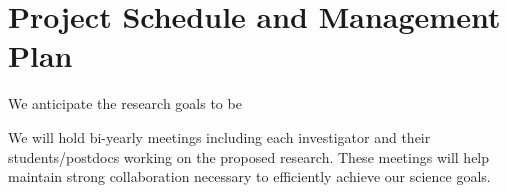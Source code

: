 \section{Project Schedule and Management Plan}

We anticipate the research goals to be 

We will  hold bi-yearly meetings including each investigator and their students/postdocs working on the proposed research. These meetings will help maintain strong collaboration necessary to efficiently achieve our science goals.
